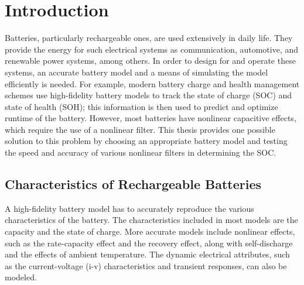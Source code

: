 \chapter{Introduction}

Batteries, particularly rechargeable ones, are used extensively in daily life. They provide the energy for such electrical systems as communication, automotive, and renewable power systems, among others. In order to design for and operate these systems, an accurate battery model and a means of simulating the model efficiently is needed. For example, modern battery charge and health management schemes use high-fidelity battery models to track the state of charge (SOC) and state of
health (SOH); this information is then used to predict and optimize runtime of the battery. However, most batteries have nonlinear capacitive effects, which require the use of a nonlinear filter. This thesis provides one possible solution to this problem by choosing an appropriate battery model and testing the speed and accuracy of various nonlinear filters in determining the SOC.


\section{Characteristics of Rechargeable Batteries}

A high-fidelity battery model has to accurately reproduce the various characteristics of the battery. The characteristics included in most models are the capacity and the state of charge. More accurate models include nonlinear effects, such as the rate-capacity effect and the recovery effect, along with self-discharge and the effects of ambient temperature. The dynamic electrical attributes, such as the current-voltage (i-v) characteristics and transient responses, can also be modeled.

